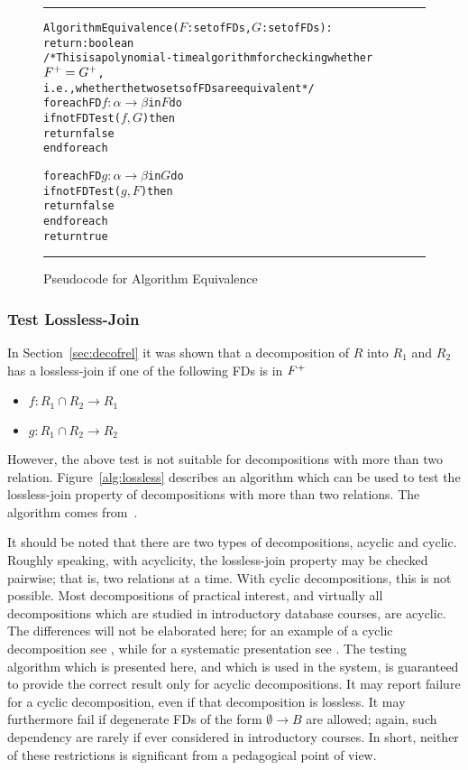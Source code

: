 \begin{figure}[htbp]
\hrule
\begin{alltt}

Algorithm Equivalence(\(F\): set of FDs, \(G\): set of FDs):
            return: boolean
/* This is a polynomial-time algorithm for checking whether \(F\sp{+} = G\sp{+}\), 
  i.e., whether the two sets of FDs are equivalent */ 
  foreach FD \(f : \alpha \rightarrow \beta\) in \(F\) do
    if not FDTest(\(f, G\)) then
      return false
  end foreach
  
  foreach FD \(g : \alpha \rightarrow \beta\) in \(G\) do
    if not FDTest(\(g, F\)) then
      return false
  end foreach
  return true
\end{alltt}
\caption{Pseudocode for Algorithm Equivalence}\label{alg:equivalence}
\hrule
\end{figure}

\subsubsection{Test Lossless-Join}
In Section~\ref{sec:decofrel} it was shown that a decomposition of $R$ into $R_1$ and $R_2$ 
has a lossless-join if one of the following FDs is in $F\sp{+}$
\begin{itemize}
  \item $f : R_1 \cap R_2 \rightarrow R_1$ 
  \item $g : R_1 \cap R_2 \rightarrow R_2$ 
\end{itemize}

However, the above test is not suitable for decompositions with more than two relation. 
Figure~\ref{alg:lossless} describes an algorithm which can be used to test
the lossless-join property of decompositions with more than two relations. The algorithm comes 
from~\cite[Algorithm 11.1]{bdb1}.

It should be noted that there are two types of decompositions, acyclic and cyclic.
Roughly speaking, with acyclicity, the lossless-join property may be
checked pairwise; that is, two relations at a time.  With cyclic
decompositions, this is not possible.  Most decompositions of
practical interest, and virtually all decompositions which are studied
in introductory database courses, are acyclic.  The differences will
not be elaborated here; for an example of a cyclic decomposition see
\cite[Section 7]{AhoBU79}, while for a systematic presentation see
\cite{BeeriFMY83}. The testing algorithm which is presented here,
and which is used in the system, is guaranteed to provide the correct
result only for acyclic decompositions. It may report failure for a
cyclic decomposition, even if that decomposition is lossless.  It may
furthermore fail if degenerate FDs of the form
 $\emptyset \rightarrow B$ are allowed; again, such dependency are
rarely if ever considered in introductory courses. In short, neither
of these restrictions is significant from a pedagogical point of view.

